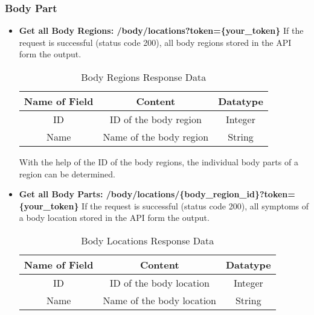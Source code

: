 \subsubsection{Body Part}
\begin{itemize}
	\item \textbf{Get all Body Regions: /body/locations?token=\{your\_token\}}
	\newline
	If the request is successful (status code 200), all body regions stored in the API form the output.
		\begin{table}[H]
			\centering
			\begin{tabular}{ | c| c| c | } 
				\hline
				Name of Field& Content & Datatype \\ 
				\hline
				ID & ID of the body region & Integer \\ 
				\hline
				Name & Name of the body region & String \\ 
				\hline
			\end{tabular}
				\caption{Body Regions Response Data}
		\end{table}

	With the help of the ID of the body regions, the individual body parts of a region can be determined.
	\item \textbf{Get all Body Parts: /body/locations/\{body\_region\_id\}?token=\{your\_token\}}
	\newline
	If the request is successful (status code 200), all symptoms of a body location stored in the API form the output.
	\begin{table}[H]
		\centering
		\begin{tabular}{ | c| c| c | } 
			\hline
			Name of Field& Content & Datatype \\ 
			\hline
			ID & ID of the body location & Integer \\ 
			\hline
			Name & Name of the body location & String \\ 
			\hline
		\end{tabular}
	 \caption{Body Locations Response Data}
	\end{table}	


\end{itemize}
